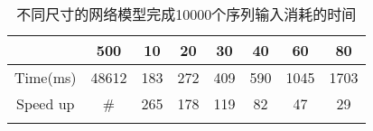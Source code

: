 \begin{center}
\begin{table}
	\caption{不同尺寸的网络模型完成10000个序列输入消耗的时间}
	\renewcommand\arraystretch{1.2}
	\setlength{\tabcolsep}{10pt}
	\begin{tabular}{cccccccc}
	\toprule
		 		&		500		&	10		&	20		&	30		&	40		&	60		&	80		\\	\midrule
	Time(ms)	&		48612	&	183		&	272		&	409		&	590		&	1045	&	1703 \\	\hline
	Speed up	&		\#		&	265		&	178		&	119		&	82		&	47		&	29 \\
	\bottomrule
	\label{tab:time}
	\end{tabular}
\end{table}
\vspace{-3em}
\end{center}

